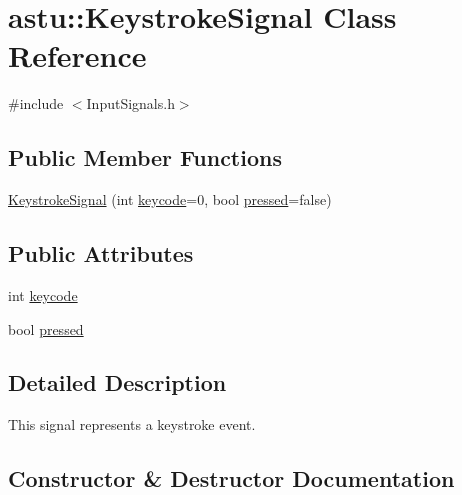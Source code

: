 \hypertarget{classastu_1_1KeystrokeSignal}{}\section{astu\+:\+:Keystroke\+Signal Class Reference}
\label{classastu_1_1KeystrokeSignal}


{\ttfamily \#include $<$Input\+Signals.\+h$>$}

\subsection*{Public Member Functions}
\begin{DoxyCompactItemize}
\item 
\hyperlink{classastu_1_1KeystrokeSignal_a568e3a68e0d03a3de6c12b3e143a0fdc}{Keystroke\+Signal} (int \hyperlink{classastu_1_1KeystrokeSignal_aae93fc72328b3093ed647f12a8a5beee}{keycode}=0, bool \hyperlink{classastu_1_1KeystrokeSignal_a73eaa883c38870bba32baa797f4bb0ac}{pressed}=false)
\end{DoxyCompactItemize}
\subsection*{Public Attributes}
\begin{DoxyCompactItemize}
\item 
int \hyperlink{classastu_1_1KeystrokeSignal_aae93fc72328b3093ed647f12a8a5beee}{keycode}
\item 
bool \hyperlink{classastu_1_1KeystrokeSignal_a73eaa883c38870bba32baa797f4bb0ac}{pressed}
\end{DoxyCompactItemize}


\subsection{Detailed Description}
This signal represents a keystroke event. 

\subsection{Constructor \& Destructor Documentation}
\mbox{\label{classastu_1_1KeystrokeSignal_a568e3a68e0d03a3de6c12b3e143a0fdc}} 
